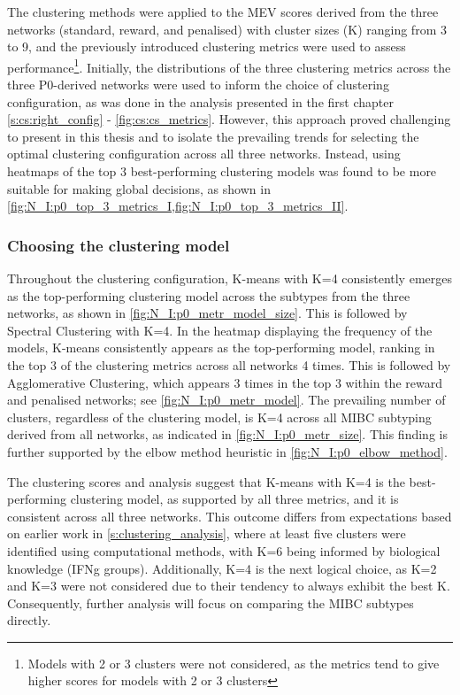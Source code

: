 The clustering methods were applied to the MEV scores derived from the three networks (standard, reward, and penalised) with cluster sizes (K) ranging from 3 to 9, and the previously introduced clustering metrics were used to assess performance\footnote{Models with 2 or 3 clusters were not considered, as the metrics tend to give higher scores for models with 2 or 3 clusters}. Initially, the distributions of the three clustering metrics across the three P0-derived networks were used to inform the choice of clustering configuration, as was done in the analysis presented in the first chapter \cref{s:cs:right_config} - \cref{fig:cs:cs_metrics}. However, this approach proved challenging to present in this thesis and to isolate the prevailing trends for selecting the optimal clustering configuration across all three networks. Instead, using heatmaps of the top 3 best-performing clustering models was found to be more suitable for making global decisions, as shown in \cref{fig:N_I:p0_top_3_metrics_I,fig:N_I:p0_top_3_metrics_II}.

\subsubsection*{Choosing the clustering model} \label{s:ap:p0_clustering}

Throughout the clustering configuration, K-means with K=4 consistently emerges as the top-performing clustering model across the subtypes from the three networks, as shown in \cref{fig:N_I:p0_metr_model_size}. This is followed by Spectral Clustering with K=4. In the heatmap displaying the frequency of the models, K-means consistently appears as the top-performing model, ranking in the top 3 of the clustering metrics across all networks 4 times. This is followed by Agglomerative Clustering, which appears 3 times in the top 3 within the reward and penalised networks; see \cref{fig:N_I:p0_metr_model}. The prevailing number of clusters, regardless of the clustering model, is K=4 across all MIBC subtyping derived from all networks, as indicated in \cref{fig:N_I:p0_metr_size}. This finding is further supported by the elbow method heuristic in \cref{fig:N_I:p0_elbow_method}.

The clustering scores and analysis suggest that K-means with K=4 is the best-performing clustering model, as supported by all three metrics, and it is consistent across all three networks. This outcome differs from expectations based on earlier work in \cref{s:clustering_analysis}, where at least five clusters were identified using computational methods, with K=6 being informed by biological knowledge (IFNg groups). Additionally, K=4 is the next logical choice, as K=2 and K=3 were not considered due to their tendency to always exhibit the best K. Consequently, further analysis will focus on comparing the MIBC subtypes directly.


